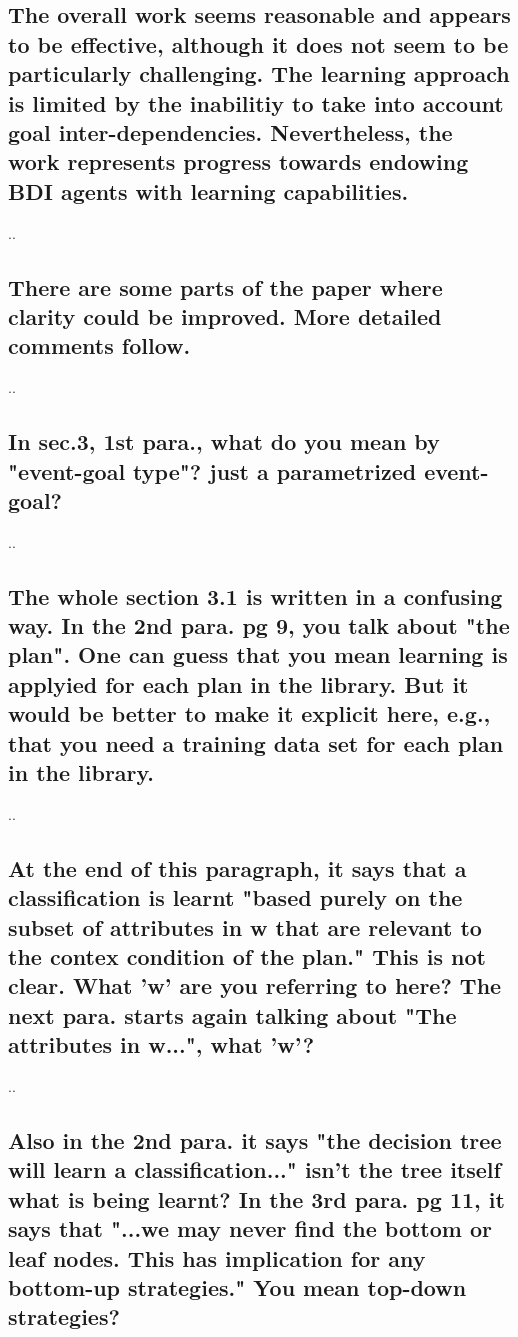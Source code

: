 \documentclass[preprint,12pt]{elsarticle}
\begin{document}
\subsection{ The overall work seems reasonable and appears to be effective,
although it does not seem to be particularly challenging. The learning
approach is limited by the inabilitiy to take into account goal
inter-dependencies. Nevertheless, the work represents progress towards
endowing BDI agents with learning capabilities.}

..

\subsection{ There are some parts of the paper where clarity could be
improved. More detailed comments follow.}

..

\subsection{ In sec.3, 1st para., what do you mean by "event-goal type"? just a
parametrized event-goal?}

..

\subsection{ The whole section 3.1 is written in a confusing way.
In the 2nd para. pg 9, you talk about "the plan". One can guess that
you mean learning is applyied for each plan in the library. But it
would be better to make it explicit here, e.g., that you need a
training data set for each plan in the library.}

..

\subsection{ At the end of this paragraph, it says that a classification is learnt
"based purely on the subset of attributes in w that are relevant to
the contex condition of the plan." This is not clear. What 'w' are you
referring to here? The next para. starts again talking about "The
attributes in w...", what 'w'?}

..

\subsection{ Also in the 2nd para. it says "the decision tree will learn a
classification..." isn't the tree itself what is being learnt?
In the 3rd para. pg 11, it says that "...we may never find the bottom
or leaf nodes. This has implication for any bottom-up strategies."
You mean top-down strategies?}
\end{document}
